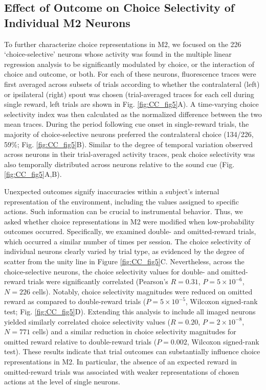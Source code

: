 \subsection[Effect of Outcome on Choice Selectivity]
{Effect of Outcome on Choice Selectivity of Individual M2 Neurons}
To further characterize choice representations in M2, we focused on the 226 ‘choice-selective’ neurons whose activity was found in the multiple linear regression analysis to be significantly modulated by choice, or the interaction of choice and outcome, or both. For each of these neurons, fluorescence traces were first averaged across subsets of trials according to whether the contralateral (left) or ipsilateral (right) spout was chosen (trial-averaged traces for each cell during single reward, left trials are shown in Fig. \ref{fig:CC_fig5}A). A time-varying choice selectivity index was then calculated as the normalized difference between the two mean traces. During the period following cue onset in single-reward trials, the majority of choice-selective neurons preferred the contralateral choice (134/226, 59\%; Fig. \ref{fig:CC_fig5}B). Similar to the degree of temporal variation observed across neurons in their trial-averaged activity traces, peak choice selectivity was also temporally distributed across neurons relative to the sound cue (Fig. \ref{fig:CC_fig5}A,B).



Unexpected outcomes signify inaccuracies within a subject’s internal representation of the environment, including the values assigned to specific actions. Such information can be crucial to instrumental behavior. Thus, we asked whether choice representations in M2 were modified when low-probability outcomes occurred. Specifically, we examined double- and omitted-reward trials, which occurred a similar number of times per session. The choice selectivity of individual neurons clearly varied by trial type, as evidenced by the degree of scatter from the unity line in Figure \ref{fig:CC_fig5}C. Nevertheless, across the choice-selective neurons, the choice selectivity values for double- and omitted-reward trials were significantly correlated (Pearson's $R = 0.31$, $P = 5 \times 10^{-6}$, $N = 226$ cells). Notably, choice selectivity magnitudes were reduced on omitted reward as compared to double-reward trials ($P = 5 \times 10^{-5}$, Wilcoxon signed-rank test; Fig. \ref{fig:CC_fig5}D). Extending this analysis to include all imaged neurons yielded similarly correlated choice selectivity values ($R = 0.20$, $P = 2 \times 10^{-8}$, $N = 771$ cells) and a similar reduction in choice selectivity magnitudes for omitted reward relative to double-reward trials ($P = 0.002$, Wilcoxon signed-rank test). These results indicate that trial outcomes can substantially influence choice representations in M2. In particular, the absence of an expected reward in omitted-reward trials was associated with weaker representations of chosen actions at the level of single neurons.

